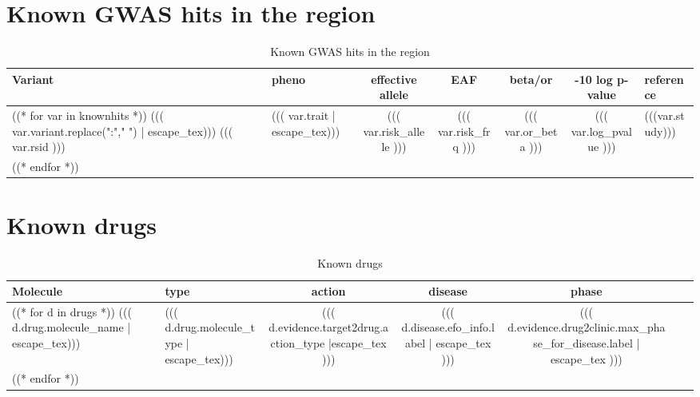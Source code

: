 \documentclass{article}
\begin{document}
\section{ Known GWAS hits in the region}
\begin{longtable}{ >{\RaggedRight}p{3cm}|L{3cm}|c|c|c|c|>{\RaggedRight}p{3cm} }
\caption{ Known GWAS hits in the region }\\
Variant & pheno & effective allele & EAF & beta/or & -10 log p-value & reference \\
\hline
((* for var in knownhits *))
((( var.variant.replace(":"," ") | escape_tex))) \newline ((( var.rsid ))) & ((( var.trait | escape_tex))) & ((( var.risk_allele ))) & ((( var.risk_frq ))) & ((( var.or_beta ))) & ((( var.log_pvalue ))) & (((var.study))) \\
((* endfor *))
\end{longtable}



\newpage

\section{ Known drugs }
\begin{longtable}{ >{\RaggedRight}p{3cm}|L{3cm}|c|c|c|c|>{\RaggedRight}p{3cm} }
\caption{ Known drugs }\\
Molecule & type & action & disease & phase \\
\hline
((* for d in drugs *))
((( d.drug.molecule_name | escape_tex))) & ((( d.drug.molecule_type | escape_tex))) & ((( d.evidence.target2drug.action_type |escape_tex ))) & ((( d.disease.efo_info.label | escape_tex ))) & ((( d.evidence.drug2clinic.max_phase_for_disease.label | escape_tex ))) \\
((* endfor *))
\end{longtable}
\endgroup
\end{document}
